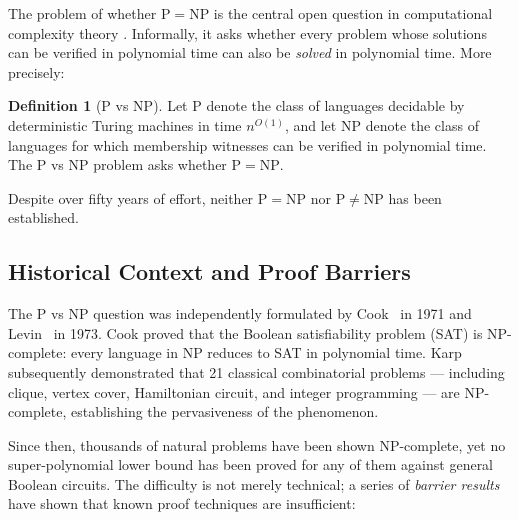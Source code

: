 \documentclass[11pt]{article}
\theoremstyle{definition}
\newtheorem{definition}[theorem]{Definition}
\theoremstyle{remark}
\begin{document}
The problem of whether $\mathrm{P} = \mathrm{NP}$ is the central open question
in computational complexity theory \cite{Cook71, Levin73}.  Informally, it asks
whether every problem whose solutions can be verified in polynomial time can
also be \emph{solved} in polynomial time.  More precisely:

\begin{definition}[P vs NP]
\label{def:pvsnp}
Let $\mathrm{P}$ denote the class of languages decidable by deterministic
Turing machines in time $n^{O(1)}$, and let $\mathrm{NP}$ denote the class of
languages for which membership witnesses can be verified in polynomial time.
The P vs NP problem asks whether $\mathrm{P} = \mathrm{NP}$.
\end{definition}

Despite over fifty years of effort, neither $\mathrm{P} = \mathrm{NP}$ nor
$\mathrm{P} \neq \mathrm{NP}$ has been established.

\subsection{Historical Context and Proof Barriers}

The P vs NP question was independently formulated by Cook~\cite{Cook71} in
1971 and Levin~\cite{Levin73} in 1973.  Cook proved that the Boolean
satisfiability problem (SAT) is NP-complete: every language in NP reduces
to SAT in polynomial time.  Karp~\cite{Karp72} subsequently demonstrated
that 21 classical combinatorial problems --- including clique, vertex cover,
Hamiltonian circuit, and integer programming --- are NP-complete, establishing
the pervasiveness of the phenomenon.

Since then, thousands of natural problems have been shown NP-complete,
yet no super-polynomial lower bound has been proved for any of them against
general Boolean circuits.  The difficulty is not merely technical; a series
of \emph{barrier results} have shown that known proof techniques are
insufficient:
\end{document}
